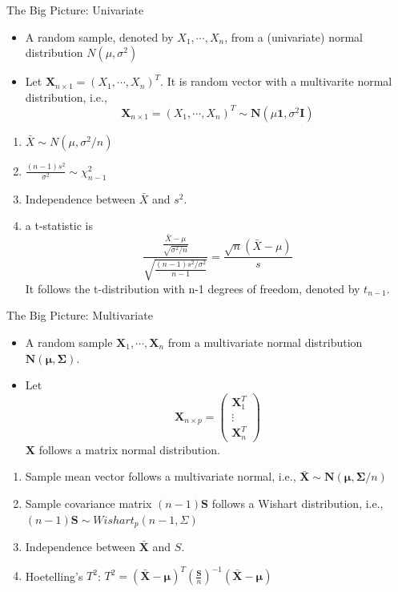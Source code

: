 \documentclass[
  ignorenonframetext,
]{beamer}
\providecommand{\tightlist}{%
  \setlength{\itemsep}{0pt}\setlength{\parskip}{0pt}}
\begin{document}
\begin{frame}{The Big Picture: Univariate}
\protect\hypertarget{the-big-picture-univariate}{}
\begin{itemize}
\tightlist
\item
  A random sample, denoted by \(X_1, \cdots, X_n\), from a (univariate)
  normal distribution \(N(\mu, \sigma^2)\)
\item
  Let \(\mathbf X_{n\times 1}=(X_1, \cdots, X_n)^T\). It is random
  vector with a multivarite normal distribution, i.e.,
  \[\mathbf X_{n\times 1}=(X_1, \cdots, X_n)^T \sim \mathbf N(\mu\mathbf 1, \sigma^2\mathbf I)\]
\end{itemize}

\begin{enumerate}
\tightlist
\item
  \(\bar X \sim N(\mu, \sigma^2/n)\)
\item
  \(\frac{(n-1)s^2}{\sigma^2} \sim \chi_{n-1}^2\)
\item
  Independence between \(\bar X\) and \(s^2\).
\item
  a t-statistic is
  \[\frac{\frac{\bar X-\mu}{\sqrt{\sigma^2/n}}}{\sqrt{\frac{(n-1)s^2/\sigma^2}{n-1}}}=\frac{\sqrt{n}(\bar X-\mu)}{s}\]
  It follows the t-distribution with n-1 degrees of freedom, denoted by
  \(t_{n-1}\).
\end{enumerate}
\end{frame}

\begin{frame}{The Big Picture: Multivariate}
\protect\hypertarget{the-big-picture-multivariate}{}
\begin{itemize}
\tightlist
\item
  A random sample \(\mathbf X_1, \cdots, \mathbf X_n\) from a
  multivariate normal distribution
  \(\mathbf N(\boldsymbol \mu, \boldsymbol \Sigma)\).
\item
  Let \[\mathbf X_{n\times p}=\begin{pmatrix}
  \mathbf X_1^T \\ \vdots \\\mathbf X_n^T
  \end{pmatrix}\] \(\mathbf X\) follows a matrix normal distribution.
\end{itemize}

\begin{enumerate}
\item
  Sample mean vector follows a multivariate normal, i.e.,
  \(\bar{\mathbf X} \sim \mathbf N(\boldsymbol \mu, \boldsymbol \Sigma/n)\)
\item
  Sample covariance matrix \((n-1)\mathbf S\) follows a Wishart
  distribution, i.e., \((n-1)\mathbf S \sim Wishart_p (n-1, \Sigma)\)
\item
  Independence between \(\bar {\mathbf X}\) and \(S\).
\item
  Hoetelling's \(T^2\):
  \(T^2 = (\bar{\mathbf X} - \boldsymbol \mu)^T\left(\frac{\mathbf S}{n}\right)^{-1} (\bar{\mathbf X} - \boldsymbol \mu)\)
\end{enumerate}
\end{frame}
\end{document}

